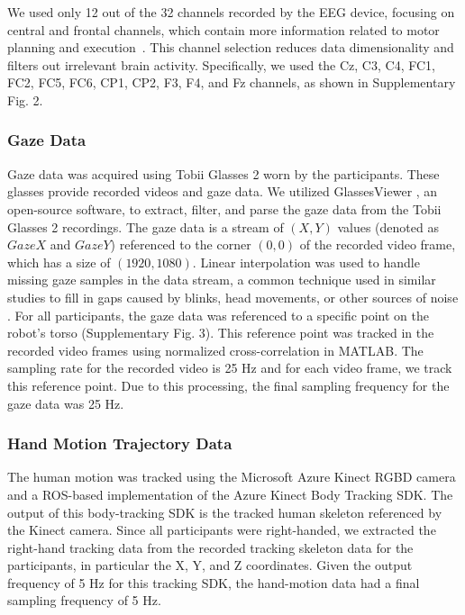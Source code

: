 We used only 12 out of the 32 channels recorded by the EEG device, focusing on central and frontal channels, which contain more information related to motor planning and execution~\cite{hanakawa2003functional,chaisaen2020decoding,yu2022effects}. This channel selection reduces data dimensionality and filters out irrelevant brain activity. Specifically, we used the Cz, C3, C4, FC1, FC2, FC5, FC6, CP1, CP2, F3, F4, and Fz channels, as shown in Supplementary Fig. 2.

\subsubsection*{Gaze Data}
Gaze data was acquired using Tobii Glasses 2 \cite{Tobiiglasses:2024:Online} worn by the participants. These glasses provide recorded videos and gaze data. We utilized GlassesViewer \cite{glassviewer}, an open-source software, to extract, filter, and parse the gaze data from the Tobii Glasses 2 recordings. The gaze data is a stream of $(X,Y)$ values (denoted as $GazeX$ and $GazeY$) referenced to the corner $(0,0)$ of the recorded video frame, which has a size of $(1920,1080)$. Linear interpolation was used to handle missing gaze samples in the data stream, a common technique used in similar studies to fill in gaps caused by blinks, head movements, or other sources of noise \cite{glassviewer}. For all participants, the gaze data was referenced to a specific point on the robot's torso (Supplementary Fig. 3). 
This reference point was tracked in the recorded video frames using normalized cross-correlation in MATLAB. The sampling rate for the recorded video is 25 Hz and for each video frame, we track this reference point.
Due to this processing, the final sampling frequency for the gaze data was 25 Hz.

\subsubsection*{Hand Motion Trajectory Data}
The human motion was tracked using the Microsoft Azure Kinect RGBD camera \cite{Azure_Kinect} and a ROS-based implementation of the Azure Kinect Body Tracking SDK. The output of this body-tracking SDK is the tracked human skeleton referenced by the Kinect camera. Since all participants were right-handed, we extracted the right-hand tracking data from the recorded tracking skeleton data for the participants, in particular the X, Y, and Z coordinates. Given the output frequency of 5 Hz for this tracking SDK, the hand-motion data had a final sampling frequency of 5 Hz.

